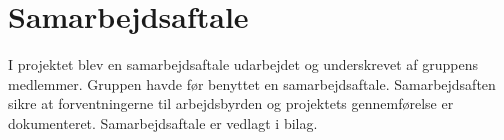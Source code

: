 \section{Samarbejdsaftale}
I projektet blev en samarbejdsaftale udarbejdet og underskrevet af gruppens medlemmer. 
Gruppen havde før benyttet en samarbejdsaftale. Samarbejdsaften sikre at forventningerne til arbejdsbyrden og projektets gennemførelse er dokumenteret.
Samarbejdsaftale er vedlagt i bilag.
